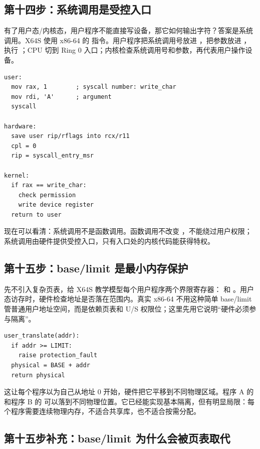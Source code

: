 \subsection{第十四步：系统调用是受控入口}

有了用户态/内核态，用户程序不能直接写设备，那它如何输出字符？答案是系统调用。X64S 使用 x86-64 的  指令。用户程序把系统调用号放进 ，把参数放进 ，执行 ；CPU 切到 Ring 0 入口；内核检查系统调用号和参数，再代表用户操作设备。

\begin{lstlisting}
user:
  mov rax, 1        ; syscall number: write_char
  mov rdi, 'A'      ; argument
  syscall

hardware:
  save user rip/rflags into rcx/r11
  cpl = 0
  rip = syscall_entry_msr

kernel:
  if rax == write_char:
    check permission
    write device register
  return to user
\end{lstlisting}

现在可以看清：系统调用不是函数调用。函数调用不改变 ，不能绕过用户权限；系统调用由硬件提供受控入口，只有入口处的内核代码能获得特权。

\subsection{第十五步：base/limit 是最小内存保护}

先不引入复杂页表，给 X64S 教学模型每个用户程序两个界限寄存器： 和 。用户态访存时，硬件检查地址是否落在范围内。真实 x86-64 不用这种简单 base/limit 管普通用户地址空间，而是依赖页表和 U/S 权限位；这里先用它说明“硬件必须参与隔离”。

\begin{lstlisting}
user_translate(addr):
  if addr >= LIMIT:
    raise protection_fault
  physical = BASE + addr
  return physical
\end{lstlisting}

这让每个程序以为自己从地址 0 开始，硬件把它平移到不同物理区域。程序 A 的  和程序 B 的  可以落到不同物理位置。它已经能实现基本隔离，但有明显局限：每个程序需要连续物理内存，不适合共享库，也不适合按需分配。

\subsection{第十五步补充：base/limit 为什么会被页表取代}

